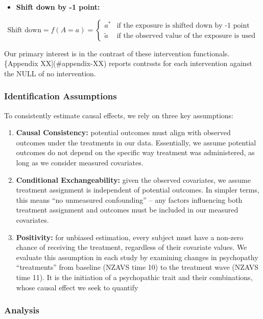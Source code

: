 \documentclass[
  singlecolumn]{article}
\providecommand{\tightlist}{%
  \setlength{\itemsep}{0pt}\setlength{\parskip}{0pt}}\usepackage{longtable,booktabs,array}
\begin{document}
\begin{itemize}
\tightlist
\item
  \textbf{Shift down by -1 point:}
\end{itemize}

\[
\text{Shift down} = f(A = a) = 
\begin{cases}
  a^* & \text{if the exposure is shifted down by -1 point} \\
  \tilde{a} & \text{if the observed value of the exposure is used}
\end{cases}
\]

Our primary interest is in the contrast of these intervention
functionals. \{Appendix XX{]}(\#appendix-XX) reports contrssts for each
intervention against the NULL of no intervention.

\subsubsection{Identification
Assumptions}\label{identification-assumptions}

To consistently estimate causal effects, we rely on three key
assumptions:

\begin{enumerate}
\def\labelenumi{\arabic{enumi}.}
\item
  \textbf{Causal Consistency:} potential outcomes must align with
  observed outcomes under the treatments in our data. Essentially, we
  assume potential outcomes do not depend on the specific way treatment
  was administered, as long as we consider measured covariates.
\item
  \textbf{Conditional Exchangeability:} given the observed covariates,
  we assume treatment assignment is independent of potential outcomes.
  In simpler terms, this means ``no unmeasured confounding'' -- any
  factors influencing both treatment assignment and outcomes must be
  included in our measured covariates.
\item
  \textbf{Positivity:} for unbiased estimation, every subject must have
  a non-zero chance of receiving the treatment, regardless of their
  covariate values. We evaluate this assumption in each study by
  examining changes in psychopathy ``treatments'' from baseline (NZAVS
  time 10) to the treatment wave (NZAVS time 11). It is the initiation
  of a psychopathic trait and their combinations, whose causal effect we
  seek to quantify
\end{enumerate}

\subsubsection{Analysis}\label{analysis}
\end{document}
